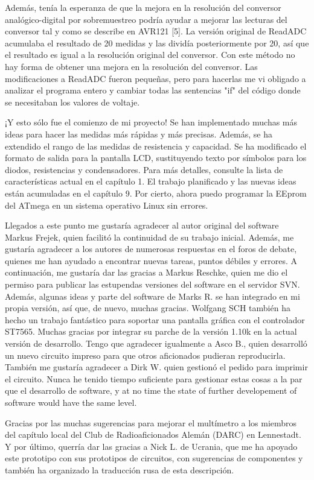 Además, tenía la esperanza de que la mejora en la resolución del conversor analógico-digital por sobremuestreo podría ayudar a mejorar las lecturas del conversor tal y como se describe en AVR121 [5]. La versión original de ReadADC acumulaba el resultado de 20 medidas y las dividía posteriormente por 20, así que el resultado es igual a la resolución original del conversor. Con este método no hay forma de obtener una mejora en la resolución del conversor. Las modificaciones a ReadADC fueron pequeñas, pero para hacerlas me vi obligado a analizar el programa entero y cambiar todas las sentencias "if" del código donde se necesitaban los valores de voltaje. 

¡Y esto sólo fue el comienzo de mi proyecto! Se han implementado muchas más ideas para hacer las medidas más rápidas y más precisas. Además, se ha extendido el rango de las medidas de resistencia y capacidad. Se ha modificado el formato de salida para la pantalla LCD, sustituyendo texto por símbolos para los diodos, resistencias y condensadores. Para más detalles, consulte la lista de características actual en el capítulo 1. El trabajo planificado y las nuevas ideas están acumuladas en el capítulo 9. Por cierto, ahora puedo programar la EEprom del ATmega en un sistema operativo Linux sin errores.

Llegados a este punto me gustaría agradecer al autor original del software Markus Frejek, quien facilitó la continuidad de su trabajo inicial. Además, me gustaría agradecer a los autores de numerosas respuestas en el foros de debate, quienes me han ayudado a encontrar nuevas tareas, puntos débiles y errores. A continuación, me gustaría dar las gracias a Markus Reschke, quien me dio el permiso para publicar las estupendas versiones del software en el servidor SVN. Además, algunas ideas y parte del software de Marks R. se han integrado en mi propia versión, así que, de nuevo, muchas gracias. Wolfgang SCH también ha hecho un trabajo fantástico para soportar una pantalla gráfica con el controlador ST7565. Muchas gracias por integrar su parche de la versión 1.10k en la actual versión de desarrollo. Tengo que agradecer igualmente a Asco B., quien desarrolló un nuevo circuito impreso para que otros aficionados pudieran reproducirla. También me gustaría agradecer a Dirk W. quien gestionó el pedido para imprimir el circuito. Nunca he tenido tiempo suficiente para gestionar estas cosas a la par que el desarrollo de software, y at no time the state of further developement of software would have the same level.

Gracias por las muchas sugerencias para mejorar el multímetro a los miembros del capítulo local del Club de Radioaficionados Alemán (DARC) en Lennestadt. Y por último, querría dar las gracias a Nick L. de Ucrania, que me ha apoyado este prototipo con sus prototipos de circuitos, con sugerencias de componentes y también ha organizado la traducción rusa de esta descripción.

